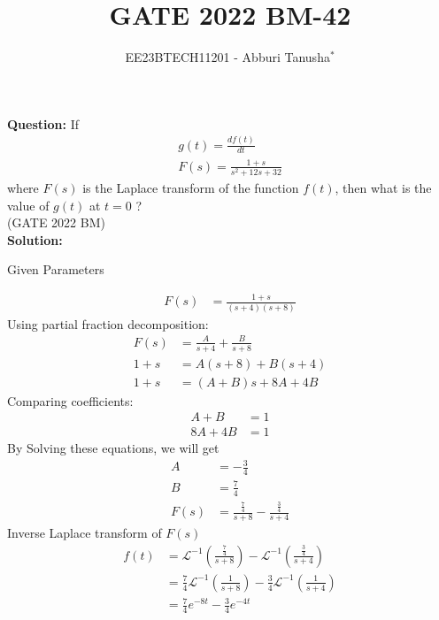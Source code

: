 \documentclass[journal,12pt,twocolumn]{IEEEtran}
\theoremstyle{remark}
\begin{document}

\vspace{3cm}

\title{GATE 2022 BM-42}
\author{EE23BTECH11201 - Abburi Tanusha$^{*}$%
}
\maketitle
\newpage
\bigskip

\renewcommand{\thefigure}{\theenumi}
\renewcommand{\thetable}{\theenumi}

\vspace{3cm}

\maketitle
\textbf{Question:} 
If \begin{align*}
 g(t) = \frac{df(t)}{dt} \\
 F(s) = \frac{1+s}{s^2+12s+32} 
 \end{align*} where $F(s)$ is the Laplace transform of the function $f(t)$, then what is the value of $g(t)$ at $t=0$ ?\\
\hfill(GATE 2022 BM)\\
\textbf{Solution:} 
\begin{table}[h!]
\centering
\resizebox{6cm}{!}{

}
\caption{Given Parameters}
\label{tab:tanu_tabel}
\end{table}
\begin{align}
F(s) &= \frac{1+s}{(s+4)(s+8)}
\end{align}
Using partial fraction decomposition:
\begin{align}
F(s) &= \frac{A}{s+4} + \frac{B}{s+8} \\
1+s &= A(s+8) + B(s+4) \\
1+s &= (A+B)s + 8A + 4B
\end{align}
Comparing coefficients:
\begin{align}
A+B &= 1 \\
8A + 4B &= 1
\end{align}
By Solving these equations, we will get
 \begin{align}
  A &= -\frac{3}{4} \\
  B &= \frac{7}{4}  \\
F(s) &= \frac{\frac{7}{4}}{s+8} - \frac{\frac{3}{4}}{s+4} 
\end{align}
Inverse Laplace transform of $F(s)$ 
\begin{align}
f(t) &= \mathcal{L}^{-1}\left(\frac{\frac{7}{4}}{s+8}\right) - \mathcal{L}^{-1}\left(\frac{\frac{3}{4}}{s+4}\right) \\
&= \frac{7}{4}\mathcal{L}^{-1}\left(\frac{1}{s+8}\right) - \frac{3}{4}\mathcal{L}^{-1}\left(\frac{1}{s+4}\right) \\
&= \frac{7}{4}e^{-8t} - \frac{3}{4}e^{-4t}
\end{align}
\end{document}
